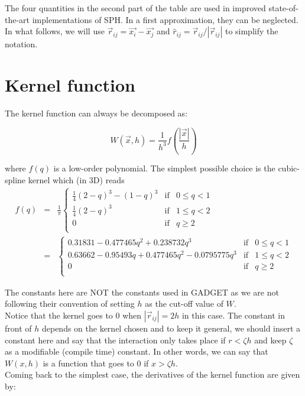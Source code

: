 \documentclass[a4paper,10pt]{report}
\begin{document}
The four quantities in the second part of the table are used in improved state-of-the-art implementations of SPH. In a
first approximation, they can be neglected. \\

In what follows, we will use $\vec{r}_{ij} = \vec{x_i} - \vec{x_j}$ and $\hat{r}_{ij} = \vec{r}_{ij}/|\vec{r}_{ij}|$
to simplify the notation.

\section{Kernel function}

The kernel function can always be decomposed as:

\begin{equation}
 W(\vec{x}, h) = \frac{1}{h^3}f\left(\frac{|\vec{x}|}{h}\right) 
\end{equation}

where $f(q)$ is a low-order polynomial. The simplest possible choice is the cubic-spline kernel which (in 3D) reads
\begin{eqnarray*}
 f(q) &=& \frac{1}{\pi}\left\lbrace \begin{array}{rcl}
                      \frac{1}{4}(2-q)^3 - (1-q)^3 & \mbox{if} & 0 \leq q < 1 \\
		      \frac{1}{4}(2-q)^3 & \mbox{if} & 1 \leq q < 2 \\
		      0 & \mbox{if} & q \geq 2 \\
                     \end{array}
 \right. \\
&=&\left\lbrace \begin{array}{rcl}
    0.31831 -0.477465 q^2+0.238732 q^3& \mbox{if} & 0 \leq q < 1 \\
   0.63662 -0.95493 q+0.477465 q^2-0.0795775 q^3  & \mbox{if} & 1 \leq q < 2 \\
		      0 & \mbox{if} & q \geq 2 \\
                     \end{array}
 \right.
\end{eqnarray*}

The constants here are NOT the constants used in GADGET as we are not following their convention of setting $h$ as the
cut-off value of $W$.\\
Notice that the kernel goes to $0$ when $|\vec{r}_{ij}| = 2h$ in this case. The constant in front of $h$ depends on the
kernel
chosen and to keep it general, we should insert a constant here and say that the interaction only takes place if
$r<\zeta h$ and keep $\zeta$ as a modifiable (compile time) constant. In other words, we can say that $W(x,h)$ is a
function that goes to $0$ if $x > \zeta h$. \\
Coming back to the simplest case, the derivatives of the kernel function are given by:
\end{document}
